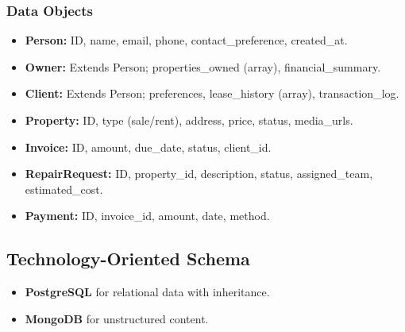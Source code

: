 \documentclass[12pt]{article}
\begin{document}
\subsubsection{Data Objects}
\begin{itemize}
    \item \textbf{Person:} ID, name, email, phone, contact\_preference, created\_at.
    \item \textbf{Owner:} Extends Person; properties\_owned (array), financial\_summary.
    \item \textbf{Client:} Extends Person; preferences, lease\_history (array), transaction\_log.
    \item \textbf{Property:} ID, type (sale/rent), address, price, status, media\_urls.
    \item \textbf{Invoice:} ID, amount, due\_date, status, client\_id.
    \item \textbf{RepairRequest:} ID, property\_id, description, status, assigned\_team, estimated\_cost.
    \item \textbf{Payment:} ID, invoice\_id, amount, date, method.
\end{itemize}

\subsection{Technology-Oriented Schema}
\begin{itemize}
    \item \textbf{PostgreSQL} for relational data with inheritance.
    \item \textbf{MongoDB} for unstructured content.
\end{itemize}
\end{document}
